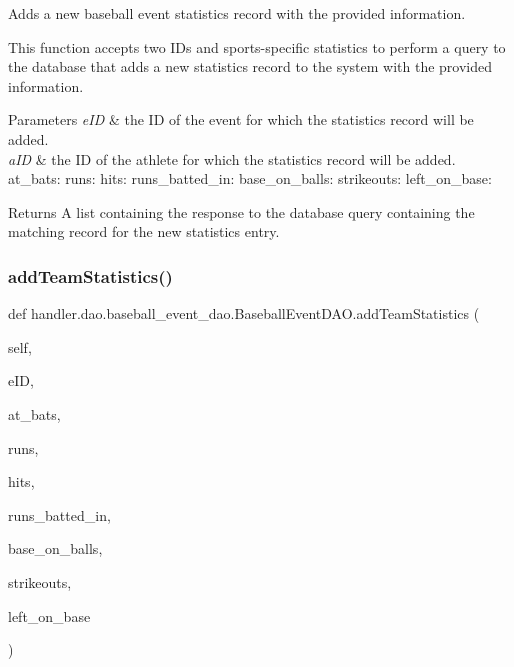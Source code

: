 Adds a new baseball event statistics record with the provided information. 

This function accepts two I\+Ds and sports-\/specific statistics to perform a query to the database that adds a new statistics record to the system with the provided information.


\begin{DoxyParams}{Parameters}
{\em e\+ID} & the ID of the event for which the statistics record will be added. \\
\hline
{\em a\+ID} & the ID of the athlete for which the statistics record will be added. at\+\_\+bats\+: runs\+: hits\+: runs\+\_\+batted\+\_\+in\+: base\+\_\+on\+\_\+balls\+: strikeouts\+: left\+\_\+on\+\_\+base\+:\\
\hline
\end{DoxyParams}
\begin{DoxyReturn}{Returns}
A list containing the response to the database query containing the matching record for the new statistics entry. 
\end{DoxyReturn}
\mbox{\label{classhandler_1_1dao_1_1baseball__event__dao_1_1_baseball_event_d_a_o_afa6c431f7bd18a5be5a399c7a7feb868}} 
\subsubsection{\texorpdfstring{add\+Team\+Statistics()}{addTeamStatistics()}}
{\footnotesize\ttfamily def handler.\+dao.\+baseball\+\_\+event\+\_\+dao.\+Baseball\+Event\+D\+A\+O.\+add\+Team\+Statistics (\begin{DoxyParamCaption}\item[{}]{self,  }\item[{}]{e\+ID,  }\item[{}]{at\+\_\+bats,  }\item[{}]{runs,  }\item[{}]{hits,  }\item[{}]{runs\+\_\+batted\+\_\+in,  }\item[{}]{base\+\_\+on\+\_\+balls,  }\item[{}]{strikeouts,  }\item[{}]{left\+\_\+on\+\_\+base }\end{DoxyParamCaption})}



